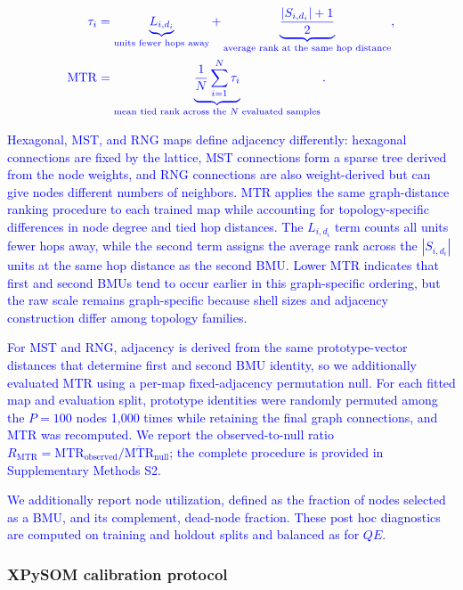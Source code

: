 \documentclass[10pt]{article} %
\newcommand{\TrackedChange}[1]{\textcolor{blue}{#1}}
\begin{document}
\begin{equation*}
\color{blue}
\begin{aligned}
\tau_i
&= \underbrace{L_{i,d_i}}_{\text{units fewer hops away}}
 + \underbrace{\frac{|S_{i,d_i}|+1}{2}}_{\text{average rank at the same hop distance}}, \\
\mathrm{MTR}
&= \underbrace{\frac{1}{N}\sum_{i=1}^{N}\tau_i}_{\text{mean tied rank across the }N\text{ evaluated samples}}.
\end{aligned}
\end{equation*}

\TrackedChange{Hexagonal, MST, and RNG maps define adjacency differently: hexagonal connections are fixed by the lattice, MST connections form a sparse tree derived from the node weights, and RNG connections are also weight-derived but can give nodes different numbers of neighbors.} \TrackedChange{MTR applies the same graph-distance ranking procedure to each trained map while accounting for topology-specific differences in node degree and tied hop distances.} \TrackedChange{The $L_{i,d_i}$ term counts all units fewer hops away, while the second term assigns the average rank across the $|S_{i,d_i}|$ units at the same hop distance as the second BMU.} \TrackedChange{Lower MTR indicates that first and second BMUs tend to occur earlier in this graph-specific ordering, but the raw scale remains graph-specific because shell sizes and adjacency construction differ among topology families.}

\TrackedChange{For MST and RNG, adjacency is derived from the same prototype-vector distances that determine first and second BMU identity, so we additionally evaluated MTR using a per-map fixed-adjacency permutation null.} \TrackedChange{For each fitted map and evaluation split, prototype identities were randomly permuted among the $P=100$ nodes 1,000 times while retaining the final graph connections, and MTR was recomputed.} \TrackedChange{We report the observed-to-null ratio $R_{\mathrm{MTR}}=\mathrm{MTR}_{\mathrm{observed}}/\overline{\mathrm{MTR}}_{\mathrm{null}}$; the complete procedure is provided in Supplementary Methods S2.}

\TrackedChange{We additionally report node utilization, defined as the fraction of nodes selected as a BMU, and its complement, dead-node fraction.} \TrackedChange{These post hoc diagnostics are computed on training and holdout splits and balanced as for $QE$.}

{\color{blue}\subsubsection{XPySOM calibration protocol}}
\end{document}
